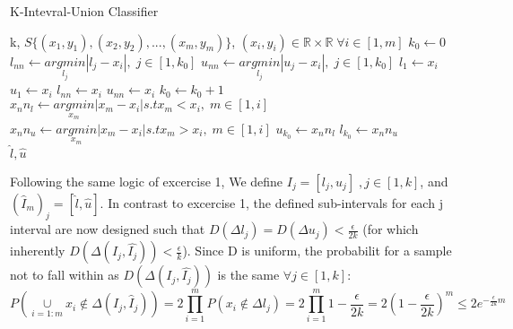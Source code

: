 \begin{algorithm}
    \caption{K-Intevral-Union Classifier}\label{alg:cap}
    \begin{algorithmic}
        \Require k, $S\{(x_1, y_1), (x_2, y_2), ..., (x_m, y_m)\}$, $(x_i, y_i) \in \mathbb{R} \times \mathbb{R} \;  \forall i \in [1, m]$
        \State $k_0 \gets 0$
            \State $l_{nn} \gets \underset{l_j}{argmin} |l_j - x_i|, \; j\in[1, k_0]$
            \State $u_{nn} \gets \underset{l_j}{argmin} |u_j - x_i|, \; j\in[1, k_0]$
                    \State $l_1 \gets x_i$
                    \State $u_1 \gets x_i$
                \Else
                        \State $l_{nn} \gets x_i$
                    \EndIf
                        \State $u_{nn} \gets x_i$
                    \EndIf
                \EndIf
            \Else
                 
                    \State $k_0 \gets k_0 + 1$
                    \State $x_nn_l \gets \underset{x_m}{argmin} |x_m - x_i| s.t x_m < x_i, \; m\in[1, i]$
                    \State $x_nn_u \gets \underset{x_m}{argmin} |x_m - x_i| s.t x_m > x_i, \; m\in[1, i]$
                    \State $u_{k_0} \gets x_nn_l$
                    \State $l_{k_0} \gets x_nn_u$
                \EndIf
            \EndIf
        \EndFor \\
    \Return $\hat{l}, \hat{u}$
    \end{algorithmic}
\end{algorithm}

Following the same logic of excercise 1, We define $I_j = [l_j, u_j] \;, j\in [1, k]$, and $(\hat{I}_m)_j = [\hat{l}, \hat{u}]$.
In contrast to excercise 1, the defined sub-intervals for each j interval are now designed such that $D(\Delta l_j) = D(\Delta u_j) < \frac{\epsilon}{2k}$
(for which inherently $D(\Delta(I_j, \hat{I_j})) < \frac{\epsilon}{k}$). Since D is uniform, the probabilit for a sample not to fall within as $D(\Delta(I_j, \hat{I_j}))$ is the same $\forall j\in[1, k]$:
\begin{equation*}
    P(\underset{i=1:m}{\cup} x_i \notin \Delta(I_j, \hat{I}_j)) = 2\prod_{i=1}^{m}P(x_i \notin \Delta l_j) 
    = 2\prod_{i=1}^{m} 1-\frac{\epsilon}{2k}= 2(1-\frac{\epsilon}{2k})^m \leq 2e^{-\frac{\epsilon}{2k}m}
\end{equation*}


